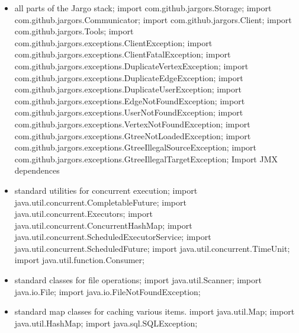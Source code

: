 \begin{itemize}
\item all parts of the Jargo stack;
\nwenddocs{}\plusendmoddef
import com.github.jargors.Storage;
import com.github.jargors.Communicator;
import com.github.jargors.Client;
import com.github.jargors.Tools;
import com.github.jargors.exceptions.ClientException;
import com.github.jargors.exceptions.ClientFatalException;
import com.github.jargors.exceptions.DuplicateVertexException;
import com.github.jargors.exceptions.DuplicateEdgeException;
import com.github.jargors.exceptions.DuplicateUserException;
import com.github.jargors.exceptions.EdgeNotFoundException;
import com.github.jargors.exceptions.UserNotFoundException;
import com.github.jargors.exceptions.VertexNotFoundException;
import com.github.jargors.exceptions.GtreeNotLoadedException;
import com.github.jargors.exceptions.GtreeIllegalSourceException;
import com.github.jargors.exceptions.GtreeIllegalTargetException;
\LA{}Import JMX dependences~{\nwtagstyle{}}\RA{}
\nwendcode{}\item standard utilities for concurrent execution;
\nwenddocs{}\plusendmoddef
import java.util.concurrent.CompletableFuture;
import java.util.concurrent.Executors;
import java.util.concurrent.ConcurrentHashMap;
import java.util.concurrent.ScheduledExecutorService;
import java.util.concurrent.ScheduledFuture;
import java.util.concurrent.TimeUnit;
import java.util.function.Consumer;
\nwendcode{}\item standard classes for file operations;
\nwenddocs{}\plusendmoddef
import java.util.Scanner;
import java.io.File;
import java.io.FileNotFoundException;
\nwendcode{}\item standard map classes for caching various items.
\nwenddocs{}\plusendmoddef
import java.util.Map;
import java.util.HashMap;
\nwendcode{}\nwdocspar
\nwenddocs{}\plusendmoddef
import java.sql.SQLException;
\nwendcode{}\nwdocspar
\end{itemize}

